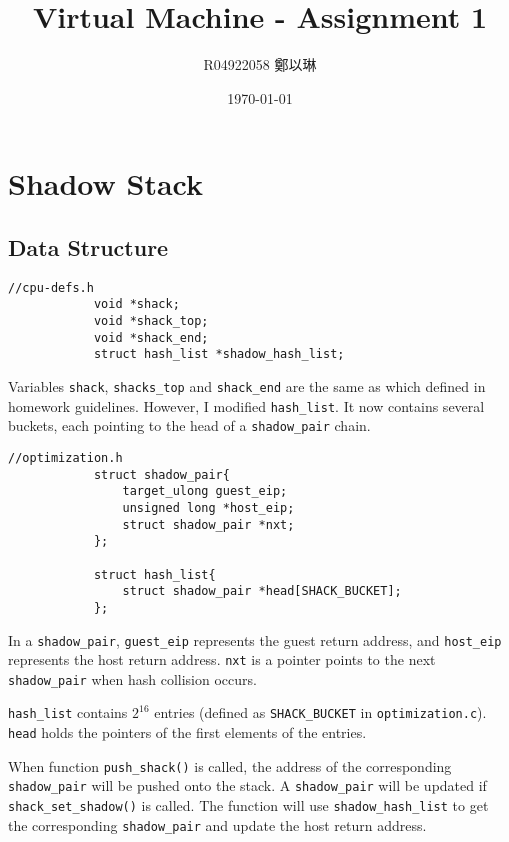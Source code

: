 \documentclass[12pt]{article}
\title{\textbf{Virtual Machine - Assignment 1}}
\author{R04922058 鄭以琳}
\date{\large \today}
\begin{document}
\maketitle

\section{Shadow Stack}
    \subsection{Data Structure}
        \begin{lstlisting}[style=Structure]
            //cpu-defs.h
            void *shack;
            void *shack_top;
            void *shack_end;
            struct hash_list *shadow_hash_list;
        \end{lstlisting}
        
        Variables \verb|shack|, \verb|shacks_top| and \verb|shack_end| are the same as which defined in homework guidelines.
        However, I modified \verb|hash_list|.
        It now contains several buckets, each pointing to the head of a \verb|shadow_pair| chain.
        \\
        \begin{lstlisting}[style=Structure]
            //optimization.h
            struct shadow_pair{
                target_ulong guest_eip;
                unsigned long *host_eip;
                struct shadow_pair *nxt;
            };

            struct hash_list{
                struct shadow_pair *head[SHACK_BUCKET];
            };
        \end{lstlisting}
        
        In a \verb|shadow_pair|, \verb|guest_eip| represents the guest return address, and \verb|host_eip| represents the host return address.
        \verb|nxt| is a pointer points to the next \verb|shadow_pair| when hash collision occurs.
        
        \verb|hash_list| contains $2^{16}$ entries (defined as \verb|SHACK_BUCKET| in \verb|optimization.c|).
        \verb|head| holds the pointers of the first elements of the entries.

        When function \verb|push_shack()| is called, the address of the corresponding \verb|shadow_pair| will be pushed onto the stack. 
        A \verb|shadow_pair| will be updated if \verb|shack_set_shadow()| is called. The function will use \verb|shadow_hash_list| to get the corresponding \verb|shadow_pair| and update the host return address.
\end{document}
